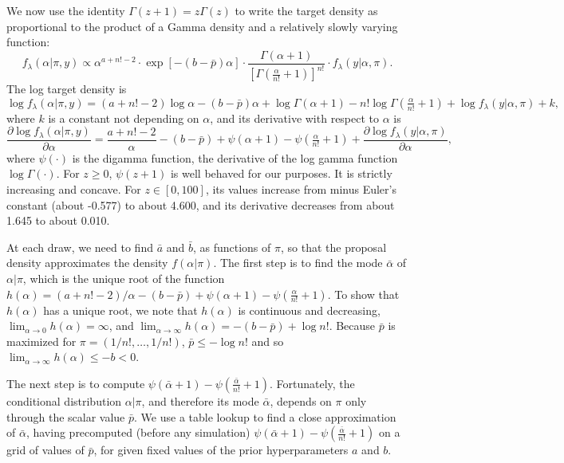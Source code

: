 \documentclass[11pt,letter]{article}
\begin{document}
We now use the identity $\Gamma(z+1) = z\Gamma(z)$ to write the target density as proportional to the product of a Gamma density and a relatively slowly varying function:
\[
  f_\lambda(\alpha|\pi,y) \propto
  \alpha^{a+n!-2} \cdot \exp[-(b - \bar{p})\alpha]
  \cdot \frac{\Gamma(\alpha + 1)}{[\Gamma(\tfrac{\alpha}{n!} + 1)]^{n!}}
  \cdot f_\lambda(y|\alpha,\pi).
\]
The log target density is
\begin{equation}\label{e:alphatarget}
  \log f_\lambda(\alpha|\pi,y) = (a+n!-2) \log \alpha - (b - \bar{p}) \alpha
  + \log \Gamma(\alpha + 1) - n! \log \Gamma(\tfrac{\alpha}{n!} + 1)
  + \log f_\lambda(y|\alpha,\pi) + k,
\end{equation}
where $k$ is a constant not depending on $\alpha$, and its derivative with respect to $\alpha$ is
\begin{equation}\label{e:truegrad}
  \frac{\partial \log f_\lambda(\alpha|\pi,y)}{\partial \alpha} =
  \frac{a + n! - 2}{\alpha} - (b-\bar{p})
  + \psi(\alpha + 1) - \psi(\tfrac{\alpha}{n!}+1)
  + \frac{\partial \log f_\lambda(y|\alpha,\pi)}{\partial \alpha},
\end{equation}
where $\psi(\cdot)$ is the digamma function, the derivative of the log gamma function $\log \Gamma(\cdot)$.
For $z \geq 0$, $\psi(z+1)$ is well behaved for our purposes.
It is strictly increasing and concave.
For $z \in [0,100]$, its values increase from minus Euler's constant (about -0.577) to about 4.600, and its derivative decreases from about 1.645 to about 0.010.

At each draw, we need to find $\bar{a}$ and $\bar{b}$, as functions of $\pi$, so that the proposal density approximates the density $f(\alpha|\pi)$.
The first step is to find the mode $\bar\alpha$ of $\alpha|\pi$, which is the unique root of the function $h(\alpha) = (a + n! -2)/\alpha -(b-\bar p) + \psi(\alpha + 1) - \psi(\tfrac{\alpha}{n!} + 1)$.
To show that $h(\alpha)$ has a unique root, we note that $h(\alpha)$ is continuous and decreasing,
$\lim_{\alpha \to 0} h(\alpha) = \infty$, and
$\lim_{\alpha \to \infty} h(\alpha) = -(b-\bar p) + \log n!$.
Because $\bar p$ is maximized for $\pi = (1/n!,\ldots,1/n!)$,
$\bar p \leq -\log n!$ and so $\lim_{\alpha \to \infty} h(\alpha) \leq -b < 0$.

The next step is to compute $\psi(\bar\alpha + 1) - \psi(\tfrac{\bar\alpha}{n!} + 1)$.
Fortunately, the conditional distribution $\alpha|\pi$, and therefore its mode $\bar\alpha$, depends on $\pi$ only through the scalar value $\bar p$.
We use a table lookup to find a close approximation of $\bar\alpha$, having precomputed (before any simulation)
$\psi(\bar\alpha + 1) - \psi(\tfrac{\bar\alpha}{n!} + 1)$ on a grid of values of $\bar p$, for given fixed values of the prior hyperparameters $a$ and $b$.
\end{document}
